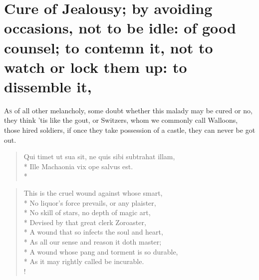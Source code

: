 \section[Cure of Jealousy: by avoiding it]{Cure of Jealousy; by avoiding occasions, not to be idle: of good counsel; to contemn it, not to watch or lock them up: to dissemble it, \etc{}}

\lettrine{A}{s} of all other melancholy, some doubt whether this malady may be cured
or no, they think 'tis like the gout, or Switzers, whom we
commonly call Walloons, those hired soldiers, if once they take
possession of a castle, they can never be got out.
%
\begin{latin}%
\begin{verse}%
Qui timet ut sua sit, ne quis sibi subtrahat illam,\\*
Ille Machaonia vix ope salvus est.\\*
\end{verse}%
\end{latin}%

\begin{verse}%
This is the cruel wound against whose smart,\\*
No liquor's force prevails, or any plaister,\\*
No skill of stars, no depth of magic art,\\*
Devised by that great clerk Zoroaster,\\*
A wound that so infects the soul and heart,\\*
As all our sense and reason it doth master;\\*
A wound whose pang and torment is so durable,\\*
As it may rightly called be incurable.\\!
\end{verse}%
%

